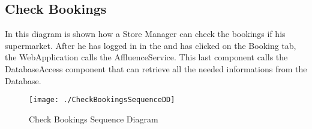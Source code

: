 \subsection{Check Bookings}
In this diagram is shown how a Store Manager can check the bookings if his supermarket. After he has logged in in the and has clicked on the Booking tab, the WebApplication calls the AffluenceService. This last component calls the DatabaseAccess component that can retrieve all the needed informations from the Database.
\begin{figure}[H]
\centerline{\texttt{[image: ./CheckBookingsSequenceDD]}}
\caption{Check Bookings Sequence Diagram}
\end{figure}


 
 